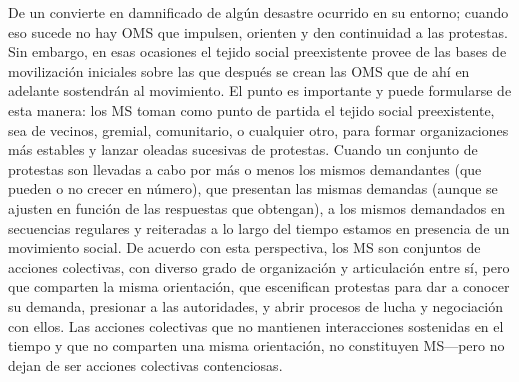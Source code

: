 \documentclass[letterpaper, 11pt]{book}
\theoremstyle{definition}
\theoremstyle{remark}
\begin{document}
{{{{{{{{De un convierte en damnificado de algún desastre ocurrido en su entorno; cuando eso sucede no hay OMS que impulsen, orienten y den continuidad a las protestas.
Sin embargo, en esas ocasiones el tejido social preexistente provee de las bases de movilización iniciales sobre las que después se crean las OMS que de ahí en adelante sostendrán al movimiento.
El punto es importante y puede formularse de esta manera: los MS toman como punto de partida el tejido social preexistente, sea de vecinos, gremial, comunitario, o cualquier otro, para formar organizaciones más estables y lanzar oleadas sucesivas de protestas.
Cuando un conjunto de protestas son llevadas a cabo por más o menos los mismos demandantes (que pueden o no crecer en número), que presentan las mismas demandas (aunque se ajusten en función de las respuestas que obtengan), a los mismos demandados en secuencias regulares y reiteradas a lo largo del tiempo estamos en presencia de un movimiento social.
De acuerdo con esta perspectiva, los MS son conjuntos de acciones colectivas, con diverso grado de organización y articulación entre sí, pero que comparten la misma orientación, que escenifican protestas para dar a conocer su demanda, presionar a las autoridades, y abrir procesos de lucha y negociación con ellos.
Las acciones colectivas que no mantienen interacciones sostenidas en el tiempo y que no comparten una misma orientación, no constituyen MS—pero no dejan de ser acciones colectivas contenciosas.}\vspace{1em}


}}}}}}}
\end{document}
